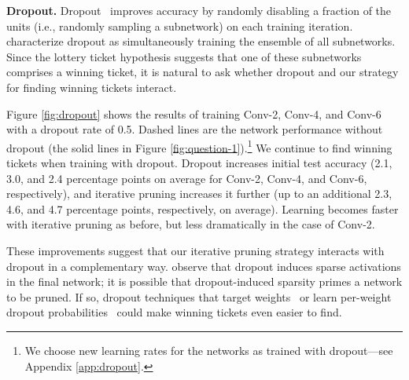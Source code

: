 \textbf{Dropout.} 
Dropout~\citep{dropout, dropout-pre} improves accuracy by randomly disabling a fraction of the units (i.e., randomly
sampling a subnetwork) on each training iteration.
\citet{understanding-dropout} characterize dropout as simultaneously training the ensemble of all subnetworks.
Since the lottery ticket hypothesis suggests that one of these subnetworks comprises a winning ticket, it is natural to ask whether dropout and our
strategy for finding winning tickets interact.

Figure \ref{fig:dropout} shows the results of training Conv-2, Conv-4, and Conv-6 with a dropout rate of 0.5. Dashed lines are the network performance
without dropout (the solid lines in Figure \ref{fig:question-1}).\footnote{We choose new learning rates for the networks as trained with
dropout---see Appendix \ref{app:dropout}.} We
continue to find winning tickets when training with dropout. Dropout increases initial test accuracy
(2.1, 3.0, and 2.4 percentage points on average for Conv-2, Conv-4, and Conv-6, respectively), and iterative pruning increases it further (up to an additional
2.3, 4.6, and 4.7 percentage points, respectively, on average).
Learning becomes faster with iterative pruning as before, but less dramatically in the case of Conv-2.

These improvements suggest that our
iterative pruning strategy interacts with dropout in a complementary way. 
\citet{dropout} observe that dropout induces sparse activations in the final network; it is possible that dropout-induced
sparsity primes a network to be pruned. If so, dropout techniques that target weights~\citep{dropconnect} or learn per-weight dropout
probabilities~\citep{variational-sparsifies, l0-reg} could make winning tickets even easier to find.

